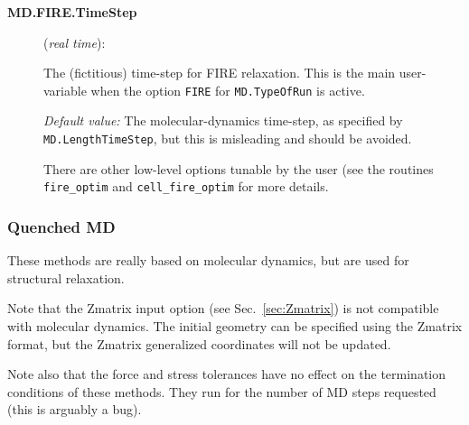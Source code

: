 \documentclass[11pt]{article}
\begin{document}
\begin{description}
\item[{\bf MD.FIRE.TimeStep}] ({\it real time}):

The (fictitious) time-step for FIRE relaxation.
This is the main user-variable
when the option {\tt FIRE} for {\tt MD.TypeOfRun} is active.

{\it Default value:} The molecular-dynamics time-step, as
specified by {\tt MD.LengthTimeStep}, but this is misleading and
should be avoided.

There are other low-level options tunable by the user (see the
routines {\tt fire\_optim} and {\tt cell\_fire\_optim} for more details.

\end{description}

\subsubsection{Quenched MD}

These methods are really based on molecular dynamics, but are used for
structural relaxation.

Note that the Zmatrix input option (see
Sec.~\ref{sec:Zmatrix}) is not compatible with molecular dynamics. The
initial geometry can be specified using the Zmatrix format, but the
Zmatrix generalized coordinates will not be updated.

Note also that the force and stress tolerances have no effect on
the termination conditions of these methods. They run for the number
of MD steps requested (this is arguably a bug).
\end{document}
